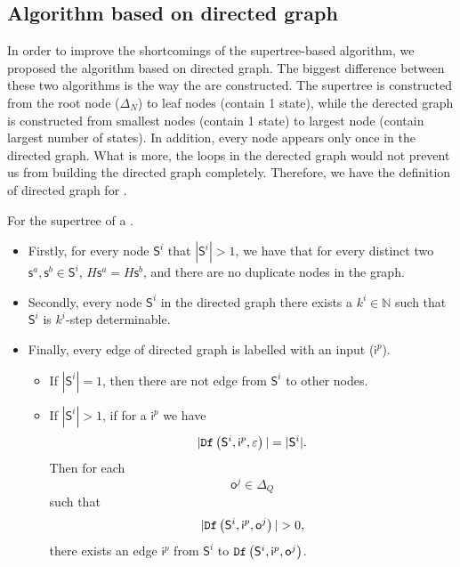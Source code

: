 \subsection{Algorithm based on directed graph}
In order to improve the shortcomings of the supertree-based algorithm, we proposed the algorithm based on directed graph. The biggest difference between these two algorithms is the way the are constructed. The supertree is constructed from the root node ($\Delta_N$) to leaf nodes (contain 1 state), while the derected graph is constructed from smallest nodes (contain 1 state) to largest node (contain largest number of states). In addition, every node appears only once in the directed graph. What is more, the loops in the derected graph would not prevent us from building the directed graph completely.
Therefore, we have the definition of directed graph for \BCNs.
\begin{definition}
For the supertree of a \BCN.   
\begin{itemize}
\item Firstly, for every node $\mathsf{S}^i$ that $|\mathsf{S}^i|>1$, we have that for every distinct two $\mathsf{s}^a, \mathsf{s}^b \in \mathsf{S}^i$, $H\mathsf{s}^a=H\mathsf{s}^b$, and there are no duplicate nodes in the graph. 
\item Secondly, every node $\mathsf{S}^i$ in the directed graph there exists a $k^{i}\in \mathbb{N}$ such that $\mathsf{S}^i$ is $k^{i}$-step determinable. 

\item Finally, every edge of directed graph is labelled with an input ($\mathsf{i}^p$). 
\begin{itemize}
 \item If $|\mathsf{S}^i|=1$, then there are not edge from $\mathsf{S}^i$ to other nodes.
 \item  If $|\mathsf{S}^i|>1$, if for a $\mathsf{i}^p$ we have \[|{\tt Df}\left(\mathsf{S}^i,\mathsf{i}^p,\varepsilon\right)|=|\mathsf{S}^i|.\] Then for each \[\mathsf{o}^{j}\in \Delta_Q\] such that \[|\Ded\left(\mathsf{S}^i,\mathsf{i}^{p},\mathsf{o}^{j}\right)|>0,\] there exists an edge $\mathsf{i}^p$ from $\mathsf{S}^i$ to ${\tt Df}\left(\mathsf{S}^i,\mathsf{i}^{p},\mathsf{o}^{j}\right)$.
 
 \end{itemize}
 \end{itemize}
\end{definition}

